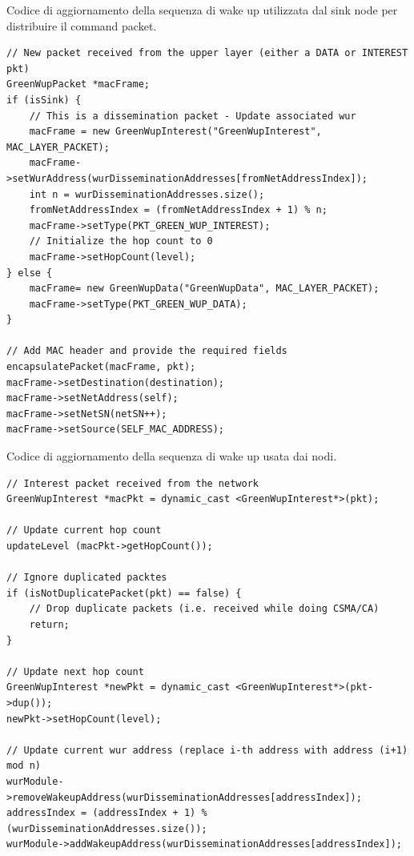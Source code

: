 \documentclass[binding=0.6cm,TFA]{sapthesis}
\begin{document}
\begin{listing}
    \caption{Codice di aggiornamento della sequenza di wake up utilizzata dal sink node per distribuire il command packet.}
    \begin{verbatim}
// New packet received from the upper layer (either a DATA or INTEREST pkt)
GreenWupPacket *macFrame;
if (isSink) {
    // This is a dissemination packet - Update associated wur
    macFrame = new GreenWupInterest("GreenWupInterest", MAC_LAYER_PACKET);
    macFrame->setWurAddress(wurDisseminationAddresses[fromNetAddressIndex]);
    int n = wurDisseminationAddresses.size();
    fromNetAddressIndex = (fromNetAddressIndex + 1) % n;
    macFrame->setType(PKT_GREEN_WUP_INTEREST);
    // Initialize the hop count to 0
    macFrame->setHopCount(level);
} else {
    macFrame= new GreenWupData("GreenWupData", MAC_LAYER_PACKET);
    macFrame->setType(PKT_GREEN_WUP_DATA);
}

// Add MAC header and provide the required fields
encapsulatePacket(macFrame, pkt);
macFrame->setDestination(destination);
macFrame->setNetAddress(self);
macFrame->setNetSN(netSN++);
macFrame->setSource(SELF_MAC_ADDRESS);

    \end{verbatim}
\end{listing}

\begin{listing}
    \caption{Codice di aggiornamento della sequenza di wake up usata dai nodi.}
    \begin{verbatim}
// Interest packet received from the network
GreenWupInterest *macPkt = dynamic_cast <GreenWupInterest*>(pkt);

// Update current hop count
updateLevel (macPkt->getHopCount());

// Ignore duplicated packtes
if (isNotDuplicatePacket(pkt) == false) {
    // Drop duplicate packets (i.e. received while doing CSMA/CA)
    return;
}

// Update next hop count
GreenWupInterest *newPkt = dynamic_cast <GreenWupInterest*>(pkt->dup());
newPkt->setHopCount(level);

// Update current wur address (replace i-th address with address (i+1) mod n)
wurModule->removeWakeupAddress(wurDisseminationAddresses[addressIndex]);
addressIndex = (addressIndex + 1) % (wurDisseminationAddresses.size());
wurModule->addWakeupAddress(wurDisseminationAddresses[addressIndex]);

    \end{verbatim}
\end{listing}
\end{document}
